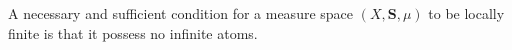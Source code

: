 A necessary and sufficient condition for a measure space $(X, \mathbf{S}, \mu)$ to be locally finite is that it possess no infinite atoms.
